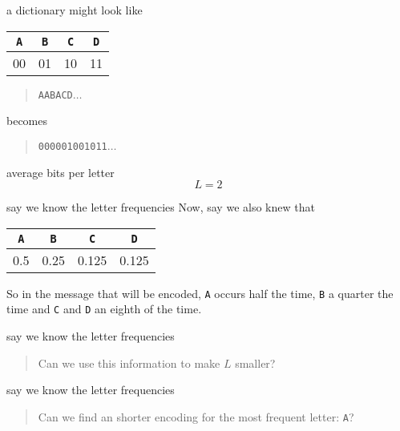 \documentclass{beamer}
\newcommand{\crish}{\color{reddish}}
\newcommand{\cbla}{\color{black}}
\newcommand{\cred}{\color{red}}
\newcommand{\sm}{\color{reddish}$}
\newcommand{\fm}{$\color{black}{}}
\newcommand{\letter}[1]{\color{blue}\texttt{#1}\color{black}}
\newcommand{\binary}[1]{\color{red}\texttt{#1}\color{black}}
\begin{document}
\begin{frame}{a dictionary might look like}
\begin{center}
\begin{tabular}{cccc}
\letter{A}&\letter{B}&\letter{C}&\letter{D}\\
\hline\cred
00&\cred 01&\cred 10&\cred 11
\cbla\end{tabular}
\end{center}
  \begin{quote}
    \letter{AABACD}$\ldots$
  \end{quote}
  becomes
    \begin{quote}
    \binary{000001001011}$\ldots$
    \end{quote}
\end{frame}

\begin{frame}{average bits per letter}
  \crish
  $$
  L=2
  $$
  \cbla
\end{frame}


\begin{frame}{say we know the letter frequencies}
  Now, say we also knew that
  \begin{center}
\begin{tabular}{cccc}
\letter{A}&\letter{B}&\letter{C}&\letter{D}\\
\hline\cred
0.5&\cred 0.25&\cred 0.125&\cred 0.125
\cbla\end{tabular}
\end{center}
So in the message that will be encoded, \letter{A}{} occurs half the
time, \letter{B}{} a quarter the time and \letter{C}{} and \letter{D}{} an
eighth of the time.
\end{frame}



\begin{frame}{say we know the letter frequencies}

\begin{quote}
  \cred Can we use this information to make \sm L\fm\cred{} smaller?\cbla
  \end{quote}
\end{frame}


\begin{frame}{say we know the letter frequencies}

\begin{quote}
  \cred
  Can we find an shorter encoding for the most frequent letter: \letter{A}?\cbla
  \end{quote}
\end{frame}
\end{document}
